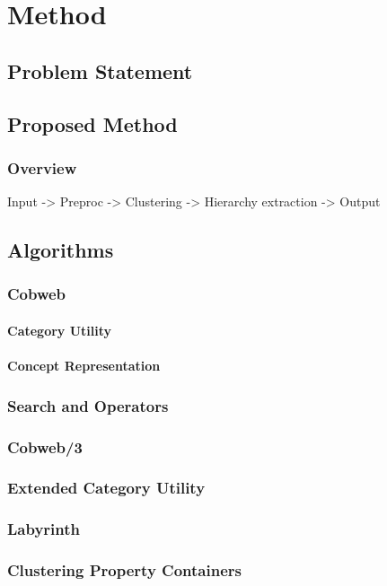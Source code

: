 \chapter{Method}
\section{Problem Statement}

\section{Proposed Method}
\subsection{Overview}
 Input -> Preproc -> Clustering -> Hierarchy extraction -> Output
\section{Algorithms}
\subsection{Cobweb}
\subsubsection{Category Utility}
\subsubsection{Concept Representation}
\subsection{Search and Operators}

\subsection{Cobweb/3}
\subsection{Extended Category Utility}

\subsection{Labyrinth}

\subsection{Clustering Property Containers}
